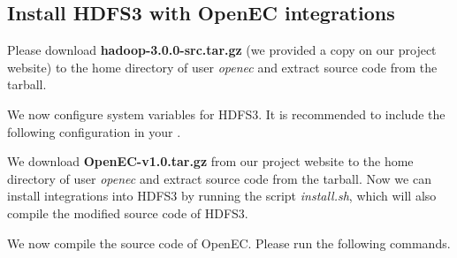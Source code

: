 \documentclass[letterpaper,12pt]{article}
\newcommand{\openec}{{\sf\small OpenEC}\xspace}
\begin{document}
\subsection{Install HDFS3 with OpenEC integrations}
Please download {\bf hadoop-3.0.0-src.tar.gz} (we provided a copy on our project website)
to the home directory of user {\sl openec} and extract source code from the tarball.

\begin{center}
\noindent{}
\end{center}

We now configure system variables for HDFS3. It is recommended to include the following
configuration in your .

\begin{center}
\noindent{}
\end{center}

We download {\bf OpenEC-v1.0.tar.gz} from our project website to the home directory of user {\sl openec}
and extract source code from the tarball. Now we can install integrations into HDFS3 by running
the script {\sl install.sh}, which will also compile the modified source code of HDFS3.

\begin{center}
\noindent{}
\end{center}

We now compile the source code of \openec. Please run the following commands.

\begin{center}
\noindent{}
\end{center}
\end{document}
